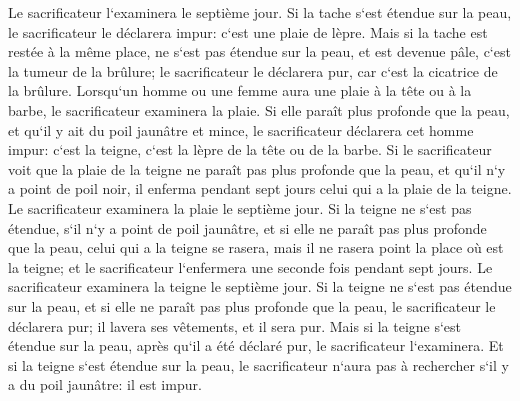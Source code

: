 \verse Le sacrificateur l`examinera le septième jour. Si la tache s`est étendue sur la peau, le sacrificateur le déclarera impur: c`est une plaie de lèpre. 
\verse Mais si la tache est restée à la même place, ne s`est pas étendue sur la peau, et est devenue pâle, c`est la tumeur de la brûlure; le sacrificateur le déclarera pur, car c`est la cicatrice de la brûlure. 
\verse Lorsqu`un homme ou une femme aura une plaie à la tête ou à la barbe, 
\verse le sacrificateur examinera la plaie. Si elle paraît plus profonde que la peau, et qu`il y ait du poil jaunâtre et mince, le sacrificateur déclarera cet homme impur: c`est la teigne, c`est la lèpre de la tête ou de la barbe. 
\verse Si le sacrificateur voit que la plaie de la teigne ne paraît pas plus profonde que la peau, et qu`il n`y a point de poil noir, il enferma pendant sept jours celui qui a la plaie de la teigne. 
\verse Le sacrificateur examinera la plaie le septième jour. Si la teigne ne s`est pas étendue, s`il n`y a point de poil jaunâtre, et si elle ne paraît pas plus profonde que la peau, 
\verse celui qui a la teigne se rasera, mais il ne rasera point la place où est la teigne; et le sacrificateur l`enfermera une seconde fois pendant sept jours. 
\verse Le sacrificateur examinera la teigne le septième jour. Si la teigne ne s`est pas étendue sur la peau, et si elle ne paraît pas plus profonde que la peau, le sacrificateur le déclarera pur; il lavera ses vêtements, et il sera pur. 
\verse Mais si la teigne s`est étendue sur la peau, après qu`il a été déclaré pur, le sacrificateur l`examinera. 
\verse Et si la teigne s`est étendue sur la peau, le sacrificateur n`aura pas à rechercher s`il y a du poil jaunâtre: il est impur. 
